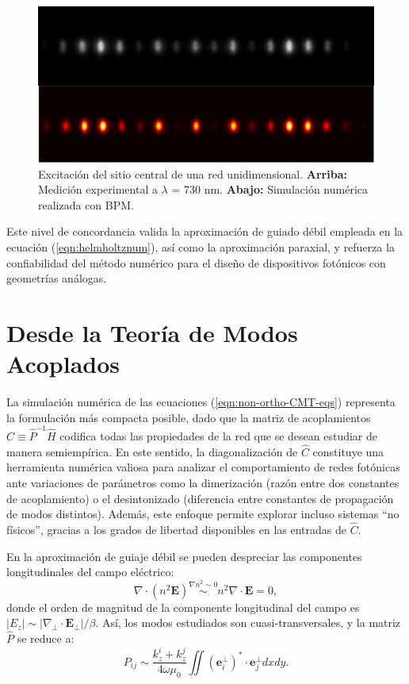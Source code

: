 \begin{figure}[H]
\centering
\includegraphics[width=0.7\linewidth]{media/num_exp_comparison.png}
\caption[Excitación del sitio central de una red unidimensional.]{
Excitación del sitio central de una red unidimensional.
\textbf{Arriba:} Medición experimental a $\lambda$ = 730 nm.
\textbf{Abajo:} Simulación numérica realizada con BPM.
\label{fig:num-exp-comp}
}
\end{figure}

Este nivel de concordancia valida la aproximación de guiado débil empleada en la ecuación (\ref{eqn:helmholtznum}), así como la aproximación paraxial, y refuerza la confiabilidad del método numérico para el diseño de dispositivos fotónicos con geometrías análogas.


\section{Desde la Teoría de Modos Acoplados \label{cap:CMT}}

La simulación numérica de las ecuaciones (\ref{eqn:non-ortho-CMT-eqs}) representa la formulación más compacta posible, dado que la matriz de acoplamientos $\hat{C} \equiv \hat{P}^{-1}\hat{H}$ codifica todas las propiedades de la red que se desean estudiar de manera semiempírica. En este sentido, la diagonalización de $\hat{C}$ constituye una herramienta numérica valiosa para analizar el comportamiento de redes fotónicas ante variaciones de parámetros como la dimerización (razón entre dos constantes de acoplamiento) o el desintonizado (diferencia entre constantes de propagación de modos distintos). Además, este enfoque permite explorar incluso sistemas ``no físicos'', gracias a los grados de libertad disponibles en las entradas de $\hat{C}$.

En la aproximación de guiaje débil se pueden despreciar las componentes longitudinales del campo eléctrico:
\[ \nabla \cdot (n^2 \textbf{E}) \overset{\nabla n^2 \sim 0}{\sim} n^2 \nabla \cdot \textbf{E} = 0,\]
donde el orden de magnitud de la componente longitudinal del campo es $|E_z| \sim |\nabla_\perp \cdot \textbf{E}_\perp|/\beta$. Así, los modos estudiados son cuasi-transversales, y la matriz $\hat{P}$ se reduce a:
\begin{equation}
    P_{ij} \sim \frac{k_z^i + k_z^j}{4\omega\mu_0} \iint \left(\textbf{e}_i^\perp\right)^* \cdot \textbf{e}_j^\perp dxdy.
    \label{eqn:CMTnum}
\end{equation}


